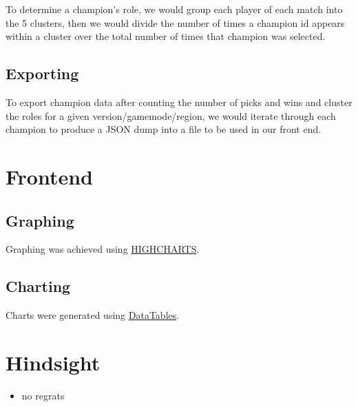 \documentclass{article}
\begin{document}
To determine a champion's role,  we would group each player of each match into the 5 clusters, then we would divide the number of times a champion id appears within a cluster over the total number of times that champion was selected.

\subsection{Exporting}
To export champion data after counting the number of picks and wins and cluster the roles for a given version/gamemode/region, we would iterate through each champion to produce a JSON dump into a file to be used in our front end.


\section{Frontend}

\subsection{Graphing}
Graphing was achieved using \href{http://www.highcharts.com/}{HIGHCHARTS}.

\subsection{Charting}
Charts were generated using \href{https://www.datatables.net/}{DataTables}.


\section{Hindsight}

\begin{itemize}
    \item no regrats
\end{itemize}


\end{document}
